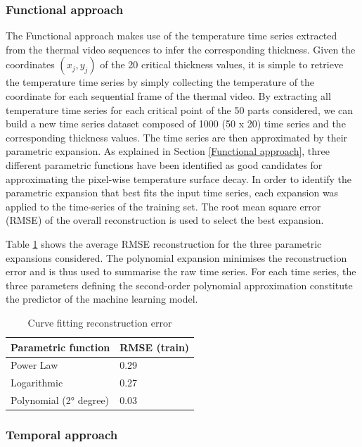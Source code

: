 \subsubsection{Functional approach}
The Functional approach makes use of the temperature time series extracted from the thermal video sequences to infer the corresponding thickness. Given the coordinates $(x_j, y_j)$ of the 20 critical thickness values, it is simple to retrieve the temperature time series by simply collecting the temperature of the coordinate for each sequential frame of the thermal video. By extracting all temperature time series for each critical point of the 50 parts considered, we can build a new time series dataset composed of 1000 (50 x 20) time series and the corresponding thickness values. The time series are then approximated by their parametric expansion. As explained in Section \ref{Functional approach}, three different parametric functions have been identified as good candidates for approximating the pixel-wise temperature surface decay. In order to identify the parametric expansion that best fits the input time series, each expansion was applied to the time-series of the training set. The root mean square error (RMSE) of the overall reconstruction is used to select the best expansion. 

Table \ref{tab:curve_fitting_error} shows the average  RMSE reconstruction for the three parametric expansions considered. The polynomial expansion minimises the reconstruction error and is thus used to summarise the raw time series. 
For each time series, the three parameters defining the second-order polynomial approximation constitute the predictor of the machine learning model.

\begin{table}
\centering
\begin{tabular}{|l|l|}
\hline
Parametric function    & RMSE (train) \\ \hline
Power Law              & 0.29         \\ \hline
Logarithmic            & 0.27         \\ \hline
Polynomial (2° degree) & 0.03         \\ \hline
\end{tabular}
\caption{Curve fitting reconstruction error}
\label{tab:curve_fitting_error}
\end{table}


\subsubsection{Temporal approach}

